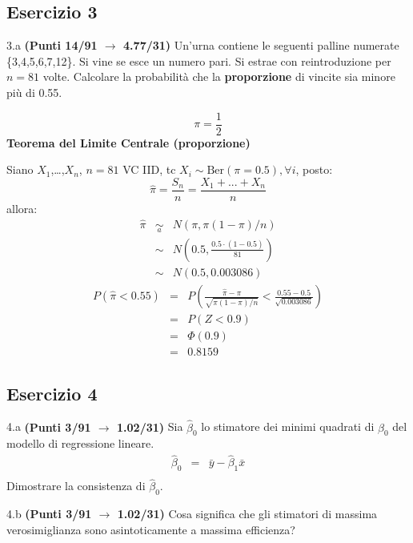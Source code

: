\documentclass[
  11pt,
]{book}
\theoremstyle{mytheoremstyle}
\theoremstyle{mydefstyle}
\newenvironment{sol}
  {
  \begin{tcolorbox}[enhanced,breakable,arc=0.1mm,boxrule=1pt,colback=white,colframe=iblue,
  title=\bf \fontfamily{lmss}\selectfont \hspace{.5 cm} Soluzione,drop fuzzy shadow]

}{
\end{tcolorbox}
  }
\begin{document}
\subsection{Esercizio 3}\label{esercizio-3-33}

3.a \textbf{(Punti 14/91 \(\rightarrow\) 4.77/31)} Un'urna contiene le seguenti palline numerate \{3,4,5,6,7,12\}. Si vine se esce un numero pari. Si estrae con reintroduzione per \(n=81\) volte.
Calcolare la probabilità che la \textbf{proporzione} di vincite sia minore più di 0.55.

\begin{sol}
\[\pi=\frac 12\]
\textbf{Teorema del Limite Centrale (proporzione)}

Siano \(X_1\),\ldots,\(X_n\), \(n=81\) VC IID, tc \(X_i\sim\text{Ber}(\pi=0.5)\)\(,\forall i\), posto:
\[
      \hat\pi=\frac{S_n}n = \frac{X_1 + ... + X_n}n
      \]
allora:\begin{eqnarray*}
  \hat\pi & \mathop{\sim}\limits_{a}& N(\pi,\pi(1-\pi)/n) \\
  &\sim & N\left(0.5,\frac{0.5\cdot(1-0.5)}{81}\right) \\
     &\sim & N(0.5,0.003086) 
  \end{eqnarray*}\begin{eqnarray*}
      P( \hat\pi   <   0.55 ) 
        &=& P\left(  \frac { \hat\pi  -  \pi }{ \sqrt{\pi(1-\pi)/n} }  <  \frac { 0.55  -  0.5 }{\sqrt{ 0.003086 }} \right)  \\
                 &=& P\left(  Z   <   0.9 \right) \\    
                 &=&  \Phi( 0.9 ) \\ &=&  0.8159 
      \end{eqnarray*}

\end{sol}

\subsection{Esercizio 4}\label{esercizio-4-33}

4.a \textbf{(Punti 3/91 \(\rightarrow\) 1.02/31)} Sia \(\hat \beta_0\) lo stimatore dei minimi quadrati di \(\beta_0\) del modello di regressione lineare.
\begin{eqnarray*}
  \hat\beta_0 &=&\bar y-  \hat\beta_1\bar x\\
\end{eqnarray*}
Dimostrare la consistenza di \(\hat\beta_0\).

4.b \textbf{(Punti 3/91 \(\rightarrow\) 1.02/31)} Cosa significa che gli stimatori di massima verosimiglianza sono asintoticamente a massima efficienza?
\end{document}
